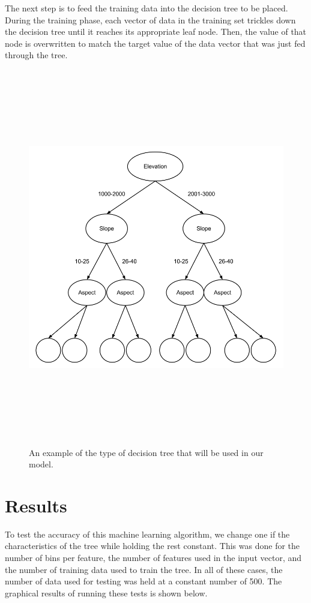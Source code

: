 \documentclass{article}
\begin{document}
	The next step is to feed the training data into the decision tree to be placed. During the training phase, each vector of data in the training set trickles down the decision tree until it reaches its appropriate leaf node. Then, the value of that node is overwritten to match the target value of the data vector that was just fed through the tree.
	
	\begin{figure}[h]
		\centerline{\includegraphics[height=6.5in]{decision-tree.png}}
		\caption{An example of the type of decision tree that will be used in our model.}
	\end{figure}
	
	\clearpage
	
	\section{Results}
	To test the accuracy of this machine learning algorithm, we change one if the characteristics of the tree while holding the rest constant. This was done for the number of bins per feature, the number of features used in the input vector, and the number of training data used to train the tree. In all of these cases, the number of data used for testing was held at a constant number of 500. The graphical results of running these tests is shown below.
	\vspace{3cm}
	
\end{document}
